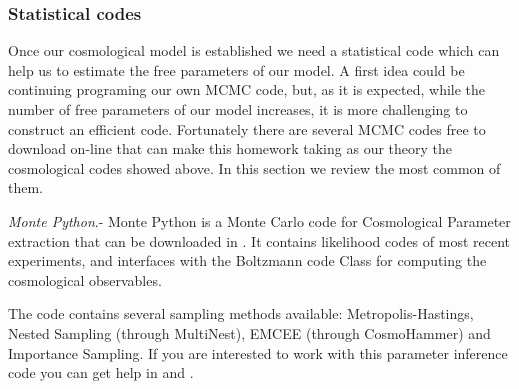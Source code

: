 \documentclass[onecolumn,           %
               showpacs,            %
               preprintnumbers,     %
               aps,                 %
               letterpaper,             %
               superscriptaddress,      %
               nofootinbib,         %
               tightenlines,        %
               floats,floatfix      %
               ,usenatbib,
               ]{revtex4-1}
\begin{document}




\subsubsection{Statistical codes}

Once our cosmological model is established we need a statistical code which can help us to estimate the free parameters of our model. A first idea could be continuing programing our own MCMC code, but, as it is expected, while the number of free parameters of our model increases, it is more challenging to construct an efficient code. Fortunately there are several MCMC codes free to download on-line that can make this homework taking as our theory the cosmological codes showed above. In this section we review the most common of them.

\textit{Monte Python}.-
Monte Python is a Monte Carlo code for Cosmological Parameter extraction  that can be downloaded in \cite{MP1}. It contains likelihood codes of most recent experiments, and interfaces with the Boltzmann code Class for computing the cosmological observables.

The code contains several sampling methods available: Metropolis-Hastings, Nested Sampling (through MultiNest), EMCEE (through CosmoHammer) and Importance Sampling. If you are interested to work with this parameter inference code you can get help in \cite{mont1} and \cite{MP2}.
\end{document}
